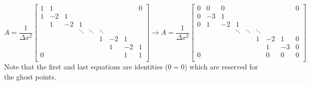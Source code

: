 \documentclass[landscape]{article}
\begin{document}
\[ A = \frac{1}{\Delta x^2} \left[\begin{array}{ccccccccc}
1  & 1     &           &           &           &           &           &         &  0 \\
1  & -2    & 1         &           &           &           &           &         &    \\
   & 1     & -2        & 1         &           &           &           &         &    \\
   &       &           & \ddots    & \ddots    & \ddots    &           &         &    \\
   &       &           &           &           & 1         & -2        & 1       &    \\
   &       &           &           &           &           &  1        & -2      &  1 \\
0  &       &           &           &           &           &           & 1       &  1 \\
\end{array} \right]
\rightarrow
A = \frac{1}{\Delta x^2} \left[\begin{array}{ccccccccc}
0  & 0     & 0         &           &           &           &           &         &  0 \\
0  & -3    & 1         &           &           &           &           &         &    \\
0  & 1     & -2        & 1         &           &           &           &         &    \\
   &       &           & \ddots    & \ddots    & \ddots    &           &         &    \\
   &       &           &           &           & 1         & -2        & 1       &  0 \\
   &       &           &           &           &           &  1        & -3      &  0 \\
0  &       &           &           &           &           &  0        & 0       &  0 \\
\end{array} \right]
\]
Note that the first and last equations are identities ($0=0$) which are reserved for the ghost points.
\end{document}
